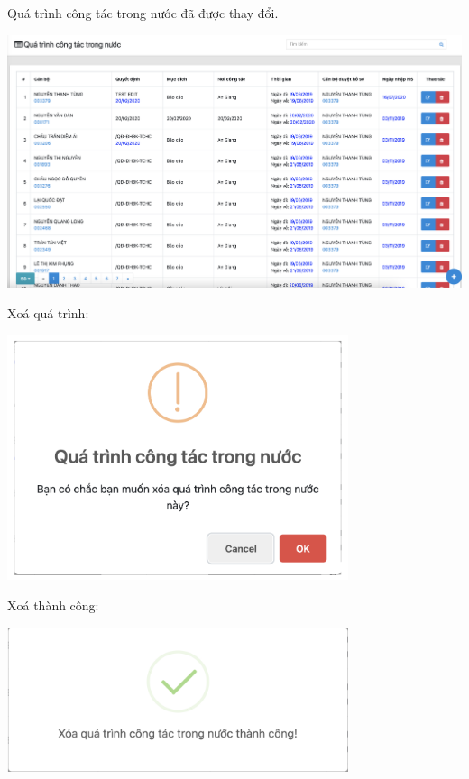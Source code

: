 Quá trình công tác trong nước đã được thay đổi.
\begin{center}
  \captionsetup{type=figure}
  \includegraphics[width=15cm]{img/test/viewEdit.png}
\end{center}
Xoá quá trình:
\begin{center}
  \captionsetup{type=figure}
  \includegraphics[width=10cm]{img/test/confirmDelete.png}
\end{center}
Xoá thành công:
\begin{center}
  \captionsetup{type=figure}
  \includegraphics[width=10cm]{img/test/aleartDelete.png}
\end{center}
